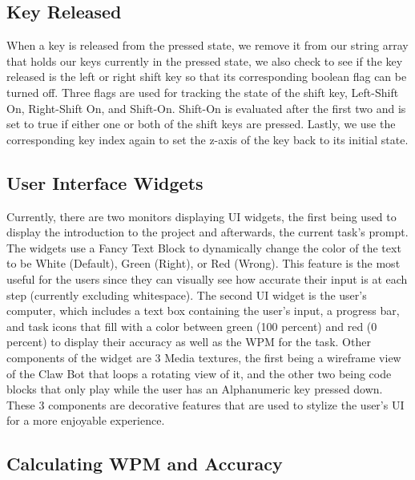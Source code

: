 \documentclass[acmlarge]{acmart}
\begin{document}
 
\subsection{Key Released} 
When a key is released from the pressed state, we remove it from our string array that holds our keys currently in the pressed state, we also check to see if the key released is the left or right shift key so that its corresponding boolean flag can be turned off. Three flags are used for tracking the state of the shift key, Left-Shift On, Right-Shift On, and Shift-On. Shift-On is evaluated after the first two and is set to true if either one or both of the shift keys are pressed. Lastly, we use the corresponding key index again to set the z-axis of the key back to its initial state. 
 

\subsection{User Interface Widgets}
Currently, there are two monitors displaying UI widgets, the first being used to display the introduction to the project and afterwards, the current task's prompt. The widgets use a Fancy Text Block to dynamically change the color of the text to be White (Default), Green (Right), or Red (Wrong). This feature is the most useful for the users since they can visually see how accurate their input is at each step (currently excluding whitespace). The second UI widget is the user's computer, which includes a text box containing the user's input, a progress bar, and task icons that fill with a color between green (100 percent) and red (0 percent) to display their accuracy as well as the WPM for the task. Other components of the widget are 3 Media textures, the first being a wireframe view of the Claw Bot that loops a rotating view of it, and the other two being code blocks that only play while the user has an Alphanumeric key pressed down. These 3 components are decorative features that are used to stylize the user's UI for a more enjoyable experience. 


\subsection{Calculating WPM and Accuracy}
\end{document}
